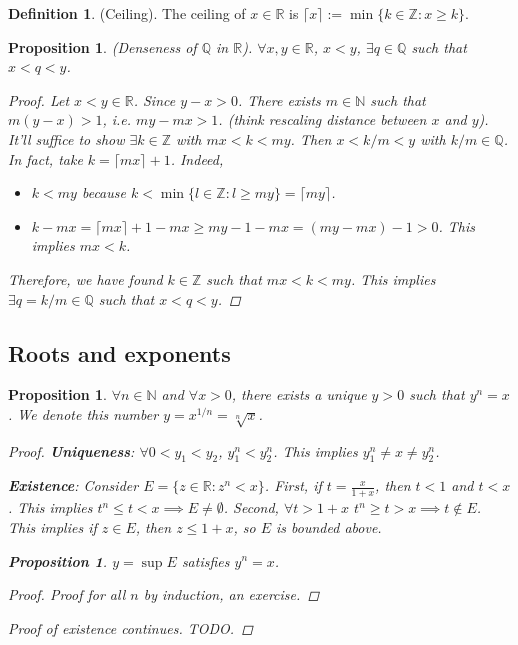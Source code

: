 \documentclass[10pt]{article}
\newcommand{\N}{\mathbb{N}}
\newcommand{\Z}{\mathbb{Z}}
\newcommand{\R}{\mathbb{R}}
\newcommand{\Q}{\mathbb{Q}}
\newtheorem{proposition}[theorem]{Proposition}
\theoremstyle{definition}
\newtheorem{definition}[theorem]{Definition}
\theoremstyle{remark}
\begin{document}
\begin{definition}
    (Ceiling).
    The ceiling of $x \in \R$ is $\lceil x \rceil := \min\{k \in \Z : x \geq k\}$.
\end{definition}

\begin{proposition}
    (Denseness of $\Q$ in $\R$).
    $\forall x, y \in \R$, $x < y$, $\exists q \in \Q$ such that $x < q < y$.
    
    \begin{proof}
        Let $x < y \in \R$. Since $y - x > 0$. There exists $m \in \N$ such that $m(y - x) > 1$, i.e. $my - mx > 1$. (think rescaling distance between $x$ and $y$).
        It'll suffice to show $\exists k \in \Z$ with $mx < k < my$. Then $x < k/m < y$ with $k/m \in \Q$.
        In fact, take $k = \lceil mx \rceil + 1$. Indeed,
        \begin{itemize}
            \item $k < my$ because $k < \min\{l \in \Z : l \geq my\} = \lceil my \rceil$.
            \item $k - mx = \lceil mx \rceil + 1 - mx \geq my - 1 - mx = (my - mx) - 1 > 0$.
        This implies $mx < k$.
        \end{itemize}
        Therefore, we have found $k \in \Z$ such that $mx < k < my$. This implies $\exists q = k/m \in \Q$ such that $x < q < y$.
    \end{proof}
\end{proposition}

\subsection{Roots and exponents}
\begin{proposition}
    $\forall n \in \N$ and $\forall x > 0$, there exists a unique $y > 0$ such that $y^n = x$.
    We denote this number $y = x^{1/n} = \sqrt[n]{x}$.
    \begin{proof}
        \textbf{Uniqueness}: $\forall 0 < y_1 < y_2$, $y_1^n < y_2^n$. This implies $y_1^n \neq x \neq y_2^n$.
        
        \textbf{Existence}: Consider $E = \{z \in \R : z^n < x\}$.
        First, if $t = \frac{x}{1+ x}$, then $t  < 1$ and $t  < x$. This implies $t^n \leq t < x \implies E \neq \emptyset$.
        Second, $\forall t > 1 + x$ $t^n \geq t > x \implies t \not\in E$.
        This implies if $z \in E$, then $z \leq 1 + x$, so $E$ is bounded above.

        \begin{proposition}
            $y = \sup E$ satisfies $y^n = x$.
            \begin{proof}
                Proof for all $n$ by induction, an exercise.
            \end{proof}
        \end{proposition}

        Proof of existence continues. TODO.

    \end{proof}
\end{proposition}
\end{document}
